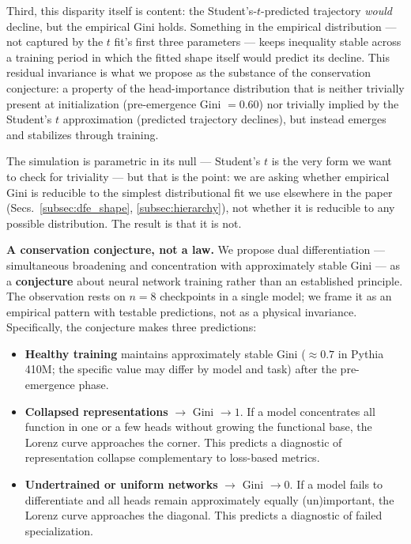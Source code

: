 \documentclass{article}
\begin{document}
Third, this disparity itself is content: the Student's-$t$-predicted trajectory \emph{would} decline, but the empirical Gini holds. Something in the empirical distribution --- not captured by the $t$ fit's first three parameters --- keeps inequality stable across a training period in which the fitted shape itself would predict its decline. This residual invariance is what we propose as the substance of the conservation conjecture: a property of the head-importance distribution that is neither trivially present at initialization (pre-emergence Gini $= 0.60$) nor trivially implied by the Student's $t$ approximation (predicted trajectory declines), but instead emerges and stabilizes through training.

The simulation is parametric in its null --- Student's $t$ is the very form we want to check for triviality --- but that is the point: we are asking whether empirical Gini is reducible to the simplest distributional fit we use elsewhere in the paper (Secs.~\ref{subsec:dfe_shape}, \ref{subsec:hierarchy}), not whether it is reducible to any possible distribution. The result is that it is not.

\textbf{A conservation conjecture, not a law.} We propose dual differentiation --- simultaneous broadening and concentration with approximately stable Gini --- as a \textbf{conjecture} about neural network training rather than an established principle. The observation rests on $n = 8$ checkpoints in a single model; we frame it as an empirical pattern with testable predictions, not as a physical invariance. Specifically, the conjecture makes three predictions:

\begin{itemize}
    \item \textbf{Healthy training} maintains approximately stable Gini ($\approx 0.7$ in Pythia 410M; the specific value may differ by model and task) after the pre-emergence phase.
    \item \textbf{Collapsed representations} $\to$ Gini $\to 1$. If a model concentrates all function in one or a few heads without growing the functional base, the Lorenz curve approaches the corner. This predicts a diagnostic of representation collapse complementary to loss-based metrics.
    \item \textbf{Undertrained or uniform networks} $\to$ Gini $\to 0$. If a model fails to differentiate and all heads remain approximately equally (un)important, the Lorenz curve approaches the diagonal. This predicts a diagnostic of failed specialization.
\end{itemize}
\end{document}
